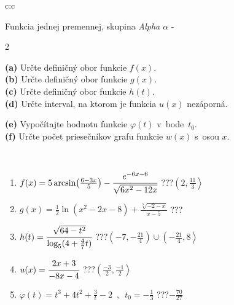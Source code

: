 \documentclass[10pt]{report}
\begin{document}
\thispagestyle{empty}
\begin{tabular}{c:c}
\begin{minipage}[c][104.5mm][t]{0.5\linewidth}
\begin{center}
\vspace{7mm}
{\huge Funkcia jednej premennej, skupina \textit{Alpha $\alpha$} -}\\[5mm]
\begin{minipage}{0.95\linewidth}
\begin{center}
{\small \begin{multicols}{2} \raggedright
\textbf{(a)} Určte definičný obor funkcie \(f(x)\). \\[1mm]
\textbf{(b)} Určte definičný obor funkcie \(g(x)\). \\[1mm]
\textbf{(c)} Určte definičný obor funkcie \(h(t)\). \\[1mm]
\textbf{(d)} Určte interval, na ktorom je funkcia \(u(x)\) nezáporná. \par \columnbreak
\textbf{(e)} Vypočítajte hodnotu funkcie \(\varphi(t)\) v~bode~\(t_0\). \\[1mm]
\textbf{(f)} Určte počet priesečníkov grafu funkcie \(w(x)\) s~osou \(x\). \\[1mm]
\end{multicols}
}
\end{center}
\end{minipage}
\\[4mm]
\begin{minipage}{0.79\linewidth}
\begin{center}
\begin{varwidth}{\linewidth}
\begin{enumerate}
\small
\item $f(x) = 5\arcsin\!\left( \frac{6-3x}{5} \right) - \cfrac{e^{-6x-6}}{\sqrt{6x^2-12x}}$\quad \dotfill\; ???\;\dotfill \quad $\left(2 , \frac{11}{3}\right\rangle$
\item $g(x) = \frac{1}{2} \ln{\!(x^2-2x-8)}+\frac{\sqrt[3]{-2-x}}{x-5}$\quad \dotfill\; ???\;\dotfill {}
\item $h(t) = \cfrac{\sqrt{64-t^2}}{\log_5(4+\frac{4}{7}t)}$\quad \dotfill\; ???\;\dotfill \quad $\left(-7 , -\frac{21}{4}\right)\cup\left(-\frac{21}{4} , 8\right\rangle$
\item $u(x) = \cfrac{2x+3}{-8x-4}$\quad \dotfill\; ???\;\dotfill \quad $\left(\frac{-3}{2} , \frac{-1}{2}\right\rangle$
\item $\varphi(t) = t^3+4t^2+\frac{3}{t}-2 \enspace , \enspace t_0=-\frac{1}{3}$\quad \dotfill\; ???\;\dotfill \quad $-\frac{70}{27}$

\end{enumerate}
\end{varwidth}
\end{center}
\end{minipage}
\end{center}
\end{minipage}
\end{tabular}
\end{document}

